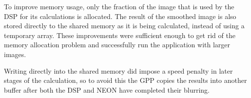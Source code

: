 To improve memory usage, only the fraction of the image that is used by the DSP for its calculations is allocated. The result of the smoothed image is also stored directly to the shared memory as it is being calculated, instead of using a temporary array. These improvements were sufficient enough to get rid of the memory allocation problem and successfully run the application with larger images.

Writing directly into the shared memory did impose a speed penalty in later stages of the calculation, so to avoid this the GPP copies the results into another buffer after both the DSP and NEON have completed their blurring.